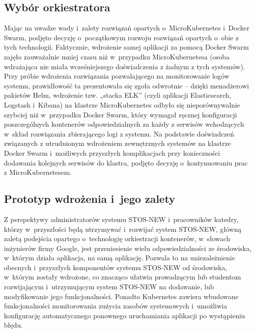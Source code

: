 \subsection{Wybór orkiestratora}
Mając na uwadze wady i~zalety rozwiązań opartych o~MicroKubernetes i~Docker Swarm, podjęto decyzję o~początkowym rozwoju rozwiązań opartych o~obie z tych technologii. Faktycznie, wdrożenie samej aplikacji za pomocą Docker Swarm zajęło zauważalnie mniej czasu niż w~przypadku MicroKubernetesa (osoba wdrażająca nie miała wcześniejszego doświadczenia z żadnym z tych systemów). Przy próbie wdrożenia rozwiązania pozwalającego na monitorowanie logów systemu, prawidłowość ta prezentowała się zgoła odwrotnie -- dzięki menadżerowi pakietów Helm, wdrożenie tzw. „stacka ELK” (czyli aplikacji Elasticsearch, Logstash i~Kibana) na klastrze MicroKubernetes odbyło się nieporównywalnie szybciej niż w~przypadku Docker Swarm, który wymagał ręcznej konfiguracji poszczególnych kontenerów odpowiedzialnych za każdy z serwisów wchodzących w~skład rozwiązania zbierającego logi z systemu. Na podstawie doświadczeń związanych z utrudnionym wdrożeniem zewnętrznych systemów na klastrze Docker Swarm i~możliwych przyszłych komplikacjach przy konieczności dodawania kolejnych serwisów do klastra, podjęto decyzję o~kontynuowaniu prac z MicroKubernetesem.

\subsection{Prototyp wdrożenia i~jego zalety}
Z perspektywy administratorów systemu STOS-NEW i~pracowników katedry, którzy w~przyszłości będą utrzymywać i~rozwijać system STOS-NEW, główną zaletą podejścia opartego o~technologię orkiestracji kontenerów, w~słowach inżynierów firmy Google\cite{googleKubernetes}, jest przeniesienie wielu odpowiedzialności ze środowiska, w~którym działa aplikacja, na samą aplikację. Pozwala to na uniezależnienie obecnych i~przyszłych komponentów systemu STOS-NEW od środowiska, w~którym zostały wdrożone, co znacząco ułatwia prowadzącym lub studentom rozwijającym i~utrzymującym system STOS-NEW na dodawanie, lub modyfikowanie jego funkcjonalności. Ponadto Kubernetes zawiera wbudowane funkcjonalności monitorowania zużycia zasobów systemowych i~umożliwia konfigurację automatycznego ponownego uruchamiania aplikacji po wystąpieniu błędu\cite{k8sPod}.

